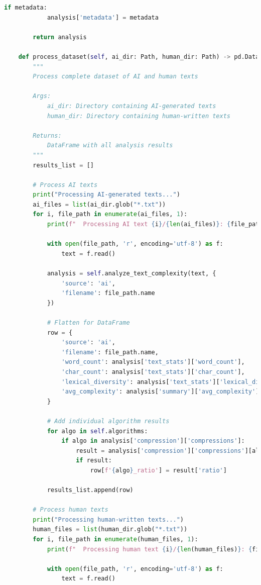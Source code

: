 \documentclass[12pt,a4paper]{report}
\begin{document}
\begin{lstlisting}[language=Python, caption=Complete Compression Analysis Framework]
        if metadata:
            analysis['metadata'] = metadata

        return analysis

    def process_dataset(self, ai_dir: Path, human_dir: Path) -> pd.DataFrame:
        """
        Process complete dataset of AI and human texts

        Args:
            ai_dir: Directory containing AI-generated texts
            human_dir: Directory containing human-written texts

        Returns:
            DataFrame with all analysis results
        """
        results_list = []

        # Process AI texts
        print("Processing AI-generated texts...")
        ai_files = list(ai_dir.glob("*.txt"))
        for i, file_path in enumerate(ai_files, 1):
            print(f"  Processing AI text {i}/{len(ai_files)}: {file_path.name}")

            with open(file_path, 'r', encoding='utf-8') as f:
                text = f.read()

            analysis = self.analyze_text_complexity(text, {
                'source': 'ai',
                'filename': file_path.name
            })

            # Flatten for DataFrame
            row = {
                'source': 'ai',
                'filename': file_path.name,
                'word_count': analysis['text_stats']['word_count'],
                'char_count': analysis['text_stats']['char_count'],
                'lexical_diversity': analysis['text_stats']['lexical_diversity'],
                'avg_complexity': analysis['summary']['avg_complexity']
            }

            # Add individual algorithm results
            for algo in self.algorithms:
                if algo in analysis['compression']['compressions']:
                    result = analysis['compression']['compressions'][algo]
                    if result:
                        row[f'{algo}_ratio'] = result['ratio']

            results_list.append(row)

        # Process human texts
        print("Processing human-written texts...")
        human_files = list(human_dir.glob("*.txt"))
        for i, file_path in enumerate(human_files, 1):
            print(f"  Processing human text {i}/{len(human_files)}: {file_path.name}")

            with open(file_path, 'r', encoding='utf-8') as f:
                text = f.read()


\end{lstlisting}
\end{document}
